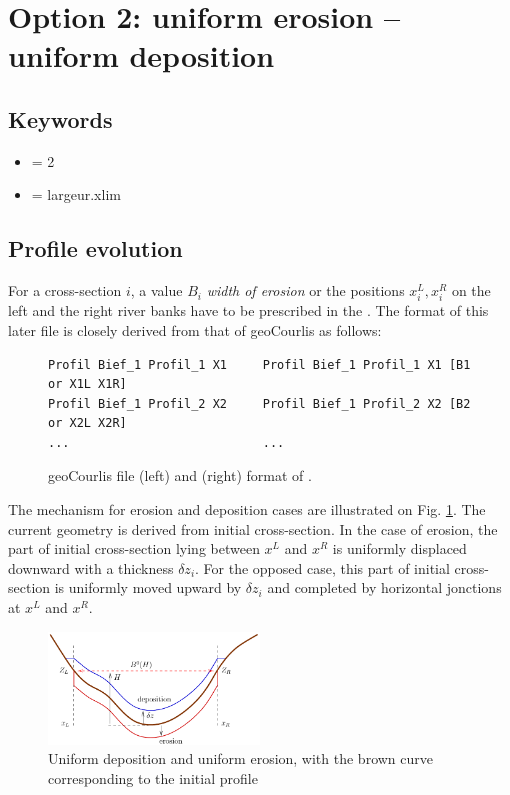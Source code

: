 \section{Option 2: uniform erosion -- uniform deposition}

\subsection{Keywords}
\begin{itemize}
\item {} = 2
\item {} = largeur.xlim
\end{itemize}

\subsection{Profile evolution}
For a cross-section $i$, a value $B_i$ {\em width of erosion} or the positions $x_i^L, x_i^R$ on the left and the right river banks have to be prescribed in the . The format of this later file is closely derived from that of geoCourlis as follows:

\begin{figure}[htb!]
\begin{verbatim}
Profil Bief_1 Profil_1 X1     Profil Bief_1 Profil_1 X1 [B1 or X1L X1R]
Profil Bief_1 Profil_2 X2     Profil Bief_1 Profil_2 X2 [B2 or X2L X2R]
...                           ...
\end{verbatim}
\caption{geoCourlis file (left) and (right) format of .}
\end{figure}

The mechanism for erosion and deposition cases are illustrated on Fig. \ref{fig:option-uni-depo-ero}. The current geometry is derived from initial cross-section. In the case of erosion, the part of initial cross-section lying between $x^L$ and $x^R$ is uniformly displaced downward with a thickness $\delta z_i$. For the opposed case, this part of initial cross-section is uniformly moved upward by $\delta z_i$ and completed by horizontal jonctions at $x^L$ and $x^R$.

\begin{figure}[htb!]
    \centering
    \includegraphics[width=0.5\textwidth]{./graphics/option-uni-depot-ero.pdf}
    \caption{Uniform deposition and uniform erosion, with the brown curve corresponding to the initial profile}
    \label{fig:option-uni-depo-ero}
\end{figure}

